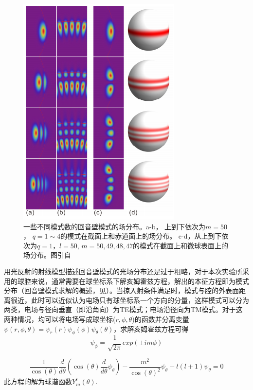 \documentclass[UTF8,a4paper,cs4size,hyperref]{ctexart}
\begin{document}
\begin{figure}
\centering
\includegraphics[scale=1 ]{mode.png}
\caption{一些不同模式数的回音壁模式的场分布。a-b， 上到下依次为$m = 50$， $q= 1\sim4$的模式在截面上和赤道面上的场分布。 c-d，从上到下依次为$q = 1$，$l = 50$,  $m = 50, 49, 48, 47$的模式在截面上和微球表面上的场分布。图引自\cite{LiBeiBei2014}}
\label{pic:mode}
\end{figure}

用光反射的射线模型描述回音壁模式的光场分布还是过于粗略，对于本次实验所采用的球腔来说，通常需要在球坐标系下解亥姆霍兹方程，解出的本征方程即为模式分布（回音壁模式求解的概述，见\cite{oraevsky2002whispering}）。当掠入射条件满足时，模式与腔的外表面距离很近，此时可以近似认为电场只有球坐标系一个方向的分量，这样模式可以分为两类，电场与径向垂直（即沿角向）为TE模式；电场沿径向为TM模式。对于这两种情况，均可以将电场写成球坐标($r, \phi, \theta$)的函数并分离变量$\psi(r, \phi, \theta) = \psi_r(r)\psi_{\phi}(\phi)\psi_{\theta}(\theta)$，求解亥姆霍兹方程可得
\begin{equation}
\psi_{\phi} = \frac{1}{\sqrt{2\pi}}exp(\pm im\phi)
\end{equation}

\begin{equation}
\frac{1}{\cos(\theta)}\frac{d}{d\theta}(\cos(\theta)\frac{d}{d\theta}\psi_{\theta})-\frac{m^2}{\cos(\theta)^2}\psi_{\theta}+l(l+1)\psi_{\theta} = 0
\end{equation}
此方程的解为球谐函数$Y^l_m(\theta)$.
\end{document}
